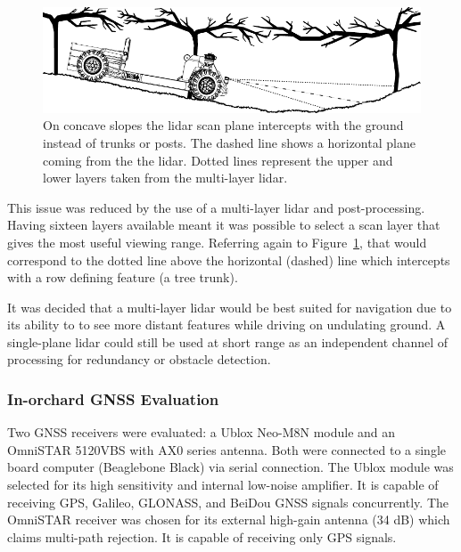 \documentclass[preprint,authoryear,12pt]{elsarticle}
\begin{document}
        \begin{figure}[htb]
            \centering
            \includegraphics[width=\linewidth]{imgs/concave_slope/concave_slope_v4.pdf}
            \caption{
                On concave slopes the lidar scan plane intercepts with the ground instead of trunks or posts.
                The dashed line shows a horizontal plane coming from the the lidar.
                Dotted lines represent the upper and lower layers taken from the multi-layer lidar.
            }
            \label{fig:concaveSlope}
        \end{figure}

        This issue was reduced by the use of a multi-layer lidar and post-processing.
        Having sixteen layers available meant it was possible to select a scan layer that gives the most useful viewing range.
        Referring again to Figure~\ref{fig:concaveSlope}, that would correspond to the dotted line above the horizontal (dashed) line which intercepts with a row defining feature (a tree trunk).

        It was decided that a multi-layer lidar would be best suited for navigation due to its ability to to see more distant features while driving on undulating ground.
        A single-plane lidar could still be used at short range as an independent channel of processing for redundancy or obstacle detection.

    \subsubsection{In-orchard GNSS Evaluation}
        Two GNSS receivers were evaluated: a Ublox Neo-M8N module and an OmniSTAR 5120VBS with AX0 series antenna.
    	Both were connected to a single board computer (Beaglebone Black) via serial connection.
        The Ublox module was selected for its high sensitivity and internal low-noise amplifier.
        It is capable of receiving GPS, Galileo, GLONASS, and BeiDou GNSS signals concurrently.
        The OmniSTAR receiver was chosen for its external high-gain antenna (34 dB) which claims multi-path rejection.
        It is capable of receiving only GPS signals.
\end{document}
